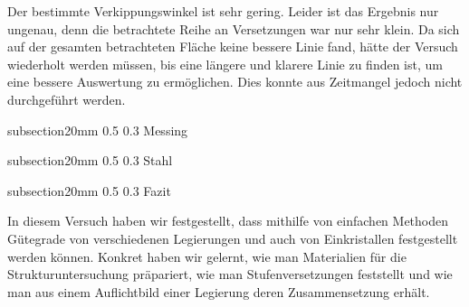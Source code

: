 \documentclass[german, %
parskip=full, %
bibliography=totoc, %
]{scrartcl}
\makeatletter
\renewcommand\subsection{\@startsection 
   {subsection}{2}{0mm}%
   {0.5\baselineskip}%
   {0.3\baselineskip}%
   {\bfseries\sffamily\large}%
   }
\makeatother
\begin{document}
Der bestimmte Verkippungswinkel ist sehr gering. Leider ist das Ergebnis nur ungenau, denn die betrachtete Reihe an Versetzungen war nur sehr klein. Da sich auf der gesamten betrachteten Fläche keine bessere Linie fand, hätte der Versuch wiederholt werden müssen, bis eine längere und klarere Linie zu finden ist, um eine bessere Auswertung zu ermöglichen. Dies konnte aus Zeitmangel jedoch nicht durchgeführt werden.

\subsection{Messing}

\subsection{Stahl}

\subsection{Fazit}

In diesem Versuch haben wir festgestellt, dass mithilfe von einfachen Methoden Gütegrade von verschiedenen Legierungen und auch von Einkristallen festgestellt werden können. Konkret haben wir gelernt, wie man Materialien für die Strukturuntersuchung präpariert, wie man Stufenversetzungen feststellt und wie man aus einem Auflichtbild einer Legierung deren Zusammensetzung erhält. 

\end{document}
